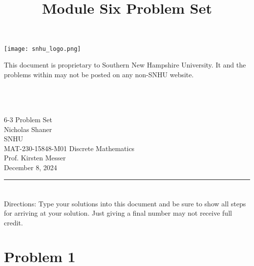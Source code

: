 \documentclass{amsart}
\theoremstyle{definition}
\theoremstyle{Exercise}
\theoremstyle{remark}
\theoremstyle{rule}
\numberwithin{equation}{section}
\begin{document}
\begin{center}
\texttt{[image: snhu\_logo.png]}
\end{center}
\title{\sf Module Six Problem Set}%



\maketitle
This document is proprietary to Southern New Hampshire University. It and the problems within may not be posted on any non-SNHU website.
\\\\\\\\
\begin{center}\doublespacing
6-3 Problem Set\\
Nicholas Shaner\\
SNHU\\
MAT-230-15848-M01 Discrete Mathematics\\
Prof. Kirsten Messer\\
December 8, 2024\\
\end{center}


\begin{center}
\rule{\textwidth}{0.4pt}
\end{center}
\newpage


\section*{}
\section*{}
Directions: Type your solutions into this document and be sure to show all steps for arriving at your solution. Just giving a final number may not receive full credit.
\\


\section*{Problem 1}
\end{document}
